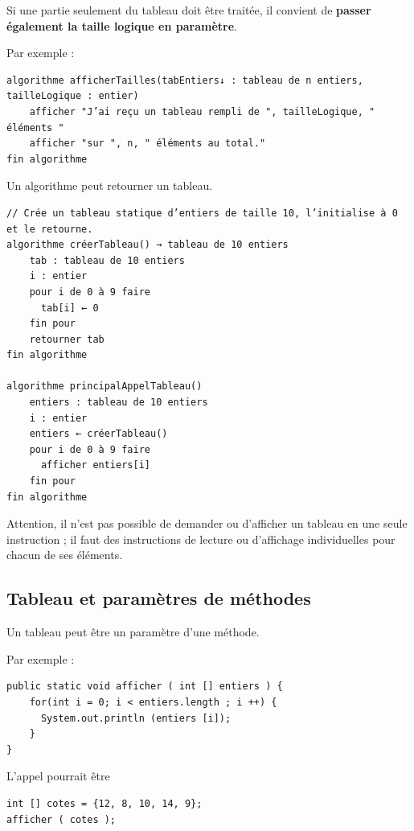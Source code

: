 \documentclass[11pt,a4paper]{article}
\begin{document}
            \par
        
        Si une partie seulement du tableau doit \^etre trait\'ee, il convient de \textbf{passer \'egalement
        la taille logique en param\`etre}.
      
            \par
        Par exemple :
            \par
        \begin{verbatim}
algorithme afficherTailles(tabEntiers↓ : tableau de n entiers, tailleLogique : entier)
    afficher "J’ai reçu un tableau rempli de ", tailleLogique, " éléments "
    afficher "sur ", n, " éléments au total."
fin algorithme
      \end{verbatim}
        Un algorithme peut retourner un tableau.
      
            \par
        \begin{verbatim}
// Crée un tableau statique d’entiers de taille 10, l’initialise à 0 et le retourne.
algorithme créerTableau() → tableau de 10 entiers
    tab : tableau de 10 entiers
    i : entier
    pour i de 0 à 9 faire
      tab[i] ← 0
    fin pour
    retourner tab
fin algorithme

algorithme principalAppelTableau()
    entiers : tableau de 10 entiers
    i : entier
    entiers ← créerTableau()
    pour i de 0 à 9 faire
      afficher entiers[i]
    fin pour
fin algorithme
      \end{verbatim}
        Attention, il n'est pas possible de demander ou d'afficher un tableau en une seule instruction ; il faut des
        instructions de lecture ou d'affichage individuelles pour chacun de ses \'el\'ements.
      
            \par
        \subsection{Tableau et param\`etres de m\'ethodes}Un tableau peut \^etre un param\`etre d'une m\'ethode.
            \par
        Par exemple :
            \par
        \begin{verbatim}
public static void afficher ( int [] entiers ) {
    for(int i = 0; i < entiers.length ; i ++) {
      System.out.println (entiers [i]);
    }
}\end{verbatim}L'appel pourrait \^etre
            \par
        \begin{verbatim}
int [] cotes = {12, 8, 10, 14, 9};
afficher ( cotes );
      \end{verbatim}
			
\end{document}
